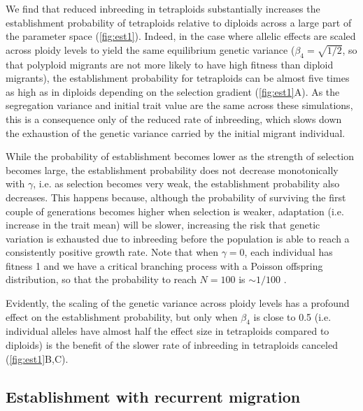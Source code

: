 \documentclass[12pt,a4paper]{article}
\begin{document}
We find that reduced inbreeding in tetraploids substantially increases the
establishment probability of tetraploids relative to diploids across a large
part of the parameter space (\cref{fig:est1}).
Indeed, in the case where allelic effects are scaled across ploidy levels
to yield the same equilibrium genetic variance ($\beta_4 = \sqrt{1/2}$, so that
polyploid migrants are not more likely to have high fitness than diploid
migrants), the establishment probability for tetraploids can be almost five
times as high as in diploids depending on the selection gradient
(\cref{fig:est1}A).
As the segregation variance and initial trait value are the same across these
simulations, this is a consequence only of the reduced rate of inbreeding,
which slows down the exhaustion of the genetic variance carried by the initial
migrant individual.

While the probability of establishment becomes lower as the strength of
selection becomes large, the establishment probability does not decrease
monotonically with $\gamma$, i.e. as selection becomes very weak, the
establishment probability also decreases.
This happens because, although the probability of surviving the first couple of
generations becomes higher when selection is weaker, adaptation (i.e. increase
in the trait mean) will be slower,
increasing the risk that genetic variation is exhausted due to inbreeding before the
population is able to reach a consistently positive growth rate.
Note that when $\gamma = 0$, each individual has fitness 1 and we have a
critical branching process with a Poisson offspring distribution, so that the
probability to reach $N=100$ is $\sim 1/100$ \citep{barton2018}.  

Evidently, the scaling of the genetic variance across ploidy levels has a
profound effect on the establishment probability, but only when $\beta_4$ is
close to 0.5 (i.e. individual alleles have almost half the effect size in
tetraploids compared to diploids) is the benefit of the slower rate of
inbreeding in tetraploids canceled (\cref{fig:est1}B,C).



\subsection*{Establishment with recurrent migration}
\end{document}
